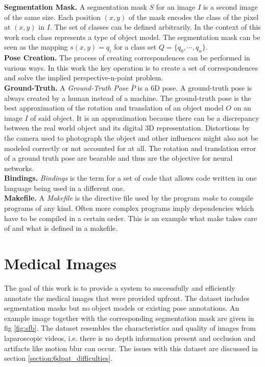 \noindent\textbf{Segmentation Mask.} A segmentation mask $S$ for an image $I$ is a second image of the same size. Each position $(x, y)$ of the mask encodes the class of the pixel at $(x, y)$ in $I$. The set of classes can be defined arbitrarily. In the context of this work each class represents a type of object model. The segmentation mask can be seen as the mapping $s(x, y) = q_i$ for a class set $Q = \{q_0, \cdots, q_n\}$. \\

\noindent\textbf{Pose Creation.} The process of creating correspondences can be performed in various ways. In this work the key operation is to create a set of correspondences and solve the implied perspective-n-point problem. \\

\noindent\textbf{Ground-Truth.} A \textit{Ground-Truth Pose} $\bar{P}$ is a 6D pose. A ground-truth pose is always created by a human instead of a machine. The ground-truth pose is the best approximation of the rotation and translation of an object model $O$ on an image $I$ of said object. It is an approximation because there can be a discrepancy between the real world object and its digital 3D representation. Distortions by the camera used to photograph the object and other influences might also not be modeled correctly or not accounted for at all. The rotation and translation error of a ground truth pose are bearable and thus are the objective for neural networks. \\

\noindent\textbf{Bindings.} \textit{Bindings} is the term for a set of code that allows code written in one language being used in a different one. \\

\noindent\textbf{Makefile.} A \textit{Makefile} is the directive file used by the program \textit{make} to compile programs of any kind. Often more complex programs imply dependencies which have to be compiled in a certain order. This is an example what make takes care of and what is defined in a makefile.

\section{Medical Images}

The goal of this work is to provide a system to successfully and efficiently annotate the medical images that were provided upfront. The dataset includes segmentation masks but no object models or existing pose annotations. An example image together with the corresponding segmentation mask are given in fig \ref{fig:sfb}. The dataset resembles the characteristics and quality of images from laparoscopic videos, i.e. there is no depth information present and occlusion and artifacts like motion blur can occur. The issues with this dataset are discussed in section \ref{section:6dpat_difficulties}. 

